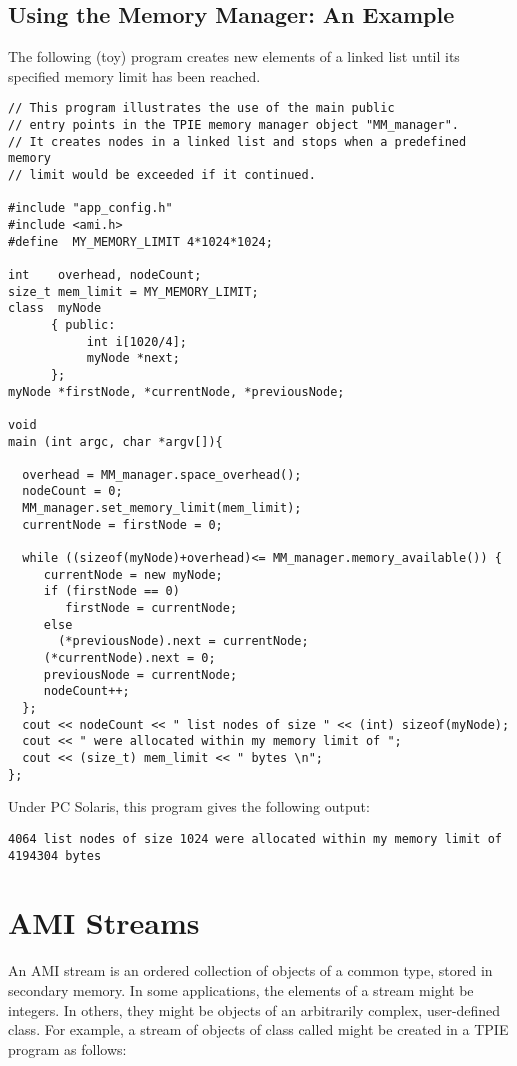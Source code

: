 \subsection{Using the Memory Manager: An Example}

The following (toy) program creates new elements of a linked
list until its specified memory limit has been reached.

\begin{verbatim}
// This program illustrates the use of the main public 
// entry points in the TPIE memory manager object "MM_manager".
// It creates nodes in a linked list and stops when a predefined memory 
// limit would be exceeded if it continued.

#include "app_config.h"
#include <ami.h>
#define  MY_MEMORY_LIMIT 4*1024*1024;

int    overhead, nodeCount;
size_t mem_limit = MY_MEMORY_LIMIT;
class  myNode 
      { public:
           int i[1020/4];
           myNode *next;
      };
myNode *firstNode, *currentNode, *previousNode;

void 
main (int argc, char *argv[]){

  overhead = MM_manager.space_overhead();
  nodeCount = 0;
  MM_manager.set_memory_limit(mem_limit);
  currentNode = firstNode = 0;

  while ((sizeof(myNode)+overhead)<= MM_manager.memory_available()) { 
     currentNode = new myNode;
     if (firstNode == 0) 
        firstNode = currentNode;
     else
       (*previousNode).next = currentNode;
     (*currentNode).next = 0;
     previousNode = currentNode;
     nodeCount++;
  };
  cout << nodeCount << " list nodes of size " << (int) sizeof(myNode); 
  cout << " were allocated within my memory limit of ";
  cout << (size_t) mem_limit << " bytes \n";
};
\end{verbatim}

Under PC Solaris, this program gives the following output:
\begin{verbatim}
4064 list nodes of size 1024 were allocated within my memory limit of 4194304 bytes
\end{verbatim}


\section{AMI Streams}

An AMI stream is an ordered collection of objects of a
common type, stored in secondary memory.  In some
applications, the elements of a stream might be integers.
In others, they might be objects of an arbitrarily complex,
user-defined class.  For example, a stream of objects of class
 called  might be created in a
TPIE program as follows:

